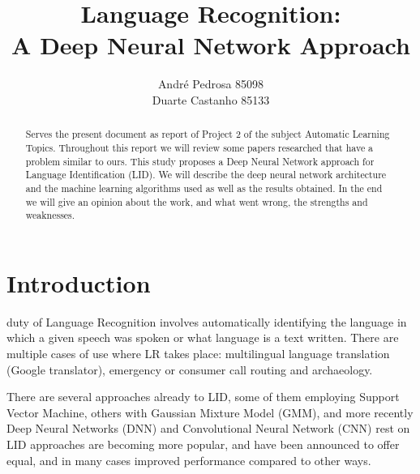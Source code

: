 \documentclass[journal, a4paper]{IEEEtran}
\begin{document}
  \title{Language Recognition: \\A Deep Neural Network Approach}
  \author{André Pedrosa 85098 \\ Duarte Castanho 85133}
  \maketitle

\begin{abstract}
Serves the present document as report of Project 2 of the  subject Automatic Learning 
  Topics. Throughout this report we will review some papers researched that have a problem 
  similar to ours. This study proposes a Deep Neural Network approach for Language 
  Identification (LID). We will describe the deep neural network architecture and the machine 
  learning algorithms used as well as the results obtained. In the end we will give an opinion 
  about the work, and what went wrong, the strengths and weaknesses.
\end{abstract}

\section{Introduction}
   duty of Language Recognition involves automatically identifying 
the language in which a given speech was spoken or what language is a text written. 
There are multiple cases of use where LR takes place: multilingual language translation 
(Google translator), emergency or consumer call routing and archaeology.

  There are several approaches already to LID, some of them employing Support Vector 
Machine, others with Gaussian Mixture Model (GMM),  and more recently Deep Neural Networks 
(DNN) and Convolutional Neural Network (CNN) rest on LID approaches are becoming more 
popular, and have been announced to offer equal, and in many cases improved performance
compared to other ways.

\end{document}
